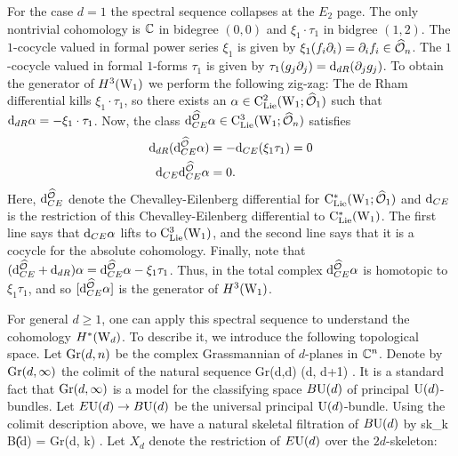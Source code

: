 \documentclass[10pt]{amsart}
\begin{document}
\begin{eg}
For the case $d = 1$ the spectral sequence collapses at the $E_2$ page. 
The only nontrivial cohomology is $\mathbb C$ in bidegree $(0,0)$ and $\xi_1 \cdot \tau_1$ in bidgree $(1,2)$. 
The $1$-cocycle valued in formal power series $\xi_1$ is given by $\xi_1(f_i \partial_i) = \partial_i f_i \in \widehat{\mathcal O}_n$. 
The $1$-cocycle valued in formal $1$-forms $\tau_1$ is given by $\tau_1(g_j \partial_j) = {\rm d}_{dR}(\partial_j g_j)$. 
To obtain the generator of $H^3({\rm W}_1)$ we perform the following zig-zag:
\ben
{} 
\een
The de Rham differential kills $\xi_1 \cdot \tau_1$, so there exists an $\alpha \in {\rm C}_{{\rm Lie}}^2({\rm W}_1 ; \widehat{\mathcal O}_1)$ such that ${\rm d}_{dR} \alpha = - \xi_1 \cdot \tau_1$. 
Now, the class ${\rm d}^{\widehat{\mathcal O}}_{CE} \alpha \in {\rm C}_{{\rm Lie}}^3({\rm W}_1 ; \widehat{\mathcal O}_n)$ satisfies
\begin{align*}
{\rm d}_{dR} ({\rm d}^{\widehat{\mathcal O}}_{CE} \alpha) & = - {\rm d}_{CE} (\xi_1 \tau_1) = 0 \\
{\rm d}_{CE} {\rm d}_{CE}^{\widehat{\mathcal O}} \alpha & = 0 .
\end{align*}
Here, ${\rm d}_{CE}^{\widehat{\mathcal O}}$ denote the Chevalley-Eilenberg differential for ${\rm C}_{{\rm Lie}}^*({\rm W}_1 ; \widehat{\mathcal O}_1)$ and ${\rm d}_{CE}$ is the restriction of this Chevalley-Eilenberg differential to ${\rm C}_{{\rm Lie}}^*({\rm W}_1)$. 
The first line says that ${\rm d}_{CE}\alpha$ lifts to ${\rm C}_{{\rm Lie}}^3({\rm W}_1)$, and the second line says that it is a cocycle for the absolute cohomology.  
Finally, note that $({\rm d}_{CE}^{\widehat{\mathcal O}} + {\rm d}_{dR} ) \alpha = {\rm d}_{CE}^{\widehat{\mathcal O}} \alpha - \xi_1 \tau_1$. 
Thus, in the total complex ${\rm d}_{CE}^{\widehat{\mathcal O}} \alpha$ is homotopic to $\xi_1 \tau_1$, and so $[{\rm d}_{CE}^{\widehat{\mathcal O}} \alpha]$ is the generator of $H^3({\rm W}_1)$. 
\end{eg}

For general $d \geq 1$, one can apply this spectral sequence to understand the cohomology $H^*({\rm W}_d)$. 
To describe it, we introduce the following topological space. 
Let ${\rm Gr}(d,n)$ be the complex Grassmannian of $d$-planes in $\mathbb C^n$. 
Denote by ${\rm Gr}(d,\infty)$ the colimit of the natural sequence 
\ben
{\rm Gr}(d,d) (d, d+1) \to \cdots . 
\een 
It is a standard fact that ${\rm Gr}(d, \infty)$ is a model for the classifying space $B{\rm U}(d)$ of principal ${\rm U}(d)$-bundles. 
Let $E{\rm U}(d) \to B{\rm U}(d)$ be the universal principal ${\rm U}(d)$-bundle. 
Using the colimit description above, we have a natural skeletal filtration of $B{\rm U}(d)$ by 
\ben
{\rm sk}_{k} B\U(d) = {\rm Gr}(d, k) .
\een 
Let $X_d$ denote the restriction of $E{\rm U}(d)$ over the $2d$-skeleton:
\ben
{}
\een
\end{document}
